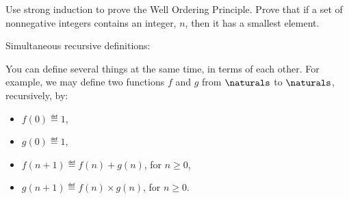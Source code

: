 \begin{problems}
\practiceproblems

\classproblems


\homeworkproblems
{}


\begin{editingnotes}
Use strong induction to prove the Well Ordering Principle. \hint Prove
that if a set of nonnegative integers contains an integer, $n$, then it
has a smallest element.
\end{editingnotes}

\begin{editingnotes}

Simultaneous recursive definitions:

  You can define several things at the same time, in terms of each
  other.  For example, we may define two functions $f$ and $g$ from
  $\naturals$ to $\naturals$, recursively, by:
  \begin{itemize}
  \item
    $f(0) \eqdef 1$,
  \item
    $g(0) \eqdef 1$,
  \item
    $f(n+1) \eqdef f(n) + g(n)$, for $n \geq 0$,
  \item
    $g(n+1) \eqdef f(n) \times g(n)$, for $n \geq 0$.
  \end{itemize}

\end{editingnotes}

\begin{editingnotes}


\end{editingnotes}
\end{problems}
